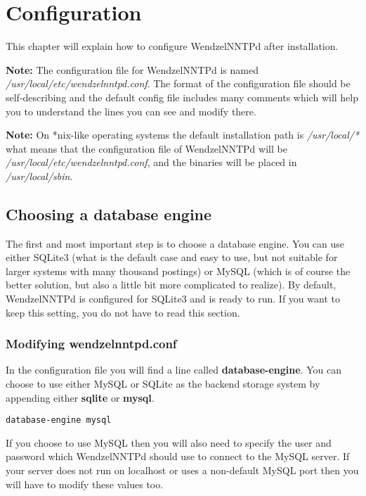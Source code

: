 \chapter{Configuration}

This chapter will explain how to configure WendzelNNTPd after installation.

\textbf{Note:} The configuration file for WendzelNNTPd is named \textit{/usr/local/etc/wendzelnntpd.conf}. The format of the configuration file should be self-describing and the default config file includes many comments which will help you to understand the lines you can see and modify there.

\textbf{Note:} On *nix-like operating systems the default installation path is \textit{/usr/local/*} what means that the configuration file of WendzelNNTPd will be \textit{/usr/local/etc/wendzelnntpd.conf}, and the binaries will be placed in \textit{/usr/local/sbin}. %

\section{Choosing a database engine}

The first and most important step is to choose a database engine. You can use either SQLite3 (what is the default case and easy to use, but not suitable for larger systems with many thousand postings) or MySQL (which is of course the better solution, but also a little bit more complicated to realize). By default, WendzelNNTPd is configured for SQLite3 and is ready to run. If you want to keep this setting, you do not have to read this section.

\subsection{Modifying wendzelnntpd.conf}

In the configuration file you will find a line called \textbf{database-engine}. You can choose to use either MySQL or SQLite as the backend storage system by appending either \textbf{sqlite} or \textbf{mysql}.

\begin{verbatim}
database-engine mysql
\end{verbatim}

If you choose to use MySQL then you will also need to specify the user and password which WendzelNNTPd should use to connect to the MySQL server. If your server does not run on localhost or uses a non-default MySQL port then you will have to modify these values too.

